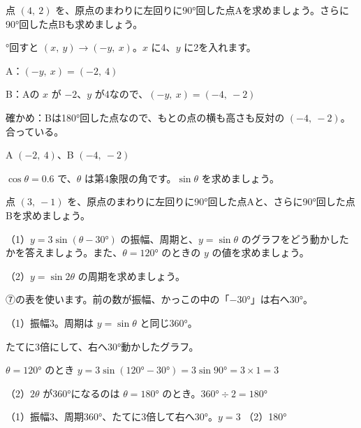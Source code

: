 \begin{reidai}[原点のまわりに90°回す]
点 $(4,\ 2)$ を、原点のまわりに左回りに90°回した点Aを求めましょう。さらに90°回した点Bも求めましょう。\par
{}°回すと $(x,\ y)\to(-y,\ x)$。$x$ に4、$y$ に2を入れます。\par
\shiki{}\zw{} A：$(-y,\ x)=(-2,\ 4)$\par
\bkivia B：Aの $x$ が $-2$、$y$ が4なので、$(-y,\ x)=(-4,\ -2)$\par
\bkivia 確かめ：Bは180°回した点なので、もとの点の横も高さも反対の $(-4,\ -2)$。合っている。\par
\kotae{}\zw{} A $(-2,\ 4)$、B $(-4,\ -2)$
\end{reidai}

\noindent\begin{minipage}[t]{0.485\linewidth}\vspace{0pt}
\begin{jibun}
$\cos\theta=0.6$ で、$\theta$ は第4象限の角です。$\sin\theta$ を求めましょう。
\end{jibun}
\end{minipage}\hfill
\begin{minipage}[t]{0.485\linewidth}\vspace{0pt}
\begin{jibun}
点 $(3,\ -1)$ を、原点のまわりに左回りに90°回した点Aと、さらに90°回した点Bを求めましょう。
\end{jibun}
\end{minipage}

\begin{reidai}[グラフの振幅・周期・ずれ]
（1）$y=3\sin(\theta-30°)$ の振幅、周期と、$y=\sin\theta$ のグラフをどう動かしたかを答えましょう。また、$\theta=120°$ のときの $y$ の値を求めましょう。\par
（2）$y=\sin2\theta$ の周期を求めましょう。\par
\kangaekata ⑦の表を使います。前の数が振幅、かっこの中の「$-30°$」は右へ30°。\par
\shiki{}\zw{} （1）振幅3。周期は $y=\sin\theta$ と同じ360°。\par
\bkivib たてに3倍にして、右へ30°動かしたグラフ。\par
\bkivib $\theta=120°$ のとき $y=3\sin(120°-30°)=3\sin90°=3\times1=3$\par
\bkiviq （2）$2\theta$ が360°になるのは $\theta=180°$ のとき。$360°\div2=180°$\par
\kotae{}\zw{} （1）振幅3、周期360°、たてに3倍して右へ30°。$y=3$
\bkiviq （2）180°
\end{reidai}

